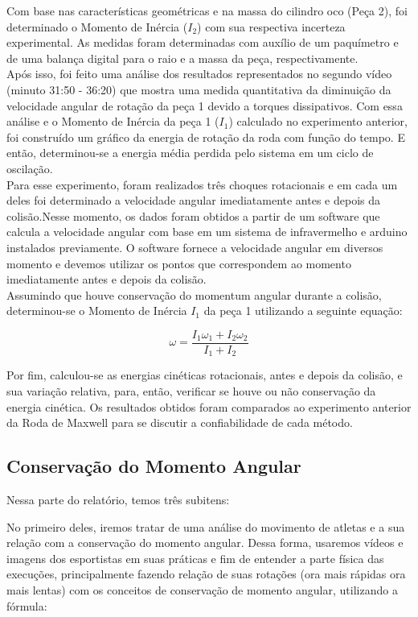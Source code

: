 Com base nas características geométricas e na massa do cilindro oco (Peça 2), foi determinado o Momento de Inércia ($I_2$) com sua respectiva incerteza experimental. As medidas foram determinadas com auxílio de um paquímetro e de uma balança digital para o raio e a massa da peça, respectivamente.\\

Após isso, foi feito uma análise dos resultados representados no segundo vídeo (minuto 31:50 - 36:20) que mostra uma medida quantitativa da diminuição da velocidade angular de rotação da peça 1 devido a torques dissipativos. Com essa análise e o Momento de Inércia da peça 1 ($I_1$) calculado no experimento anterior, foi construído um gráfico da energia de rotação da roda com função do tempo. E então, determinou-se a energia média perdida pelo sistema em um ciclo de oscilação.\\

Para esse experimento, foram realizados três choques rotacionais e em cada um deles foi determinado a velocidade angular imediatamente antes e depois da colisão.Nesse momento, os dados foram obtidos a partir de um software que calcula a velocidade angular com base em um sistema de infravermelho e arduino instalados previamente. O software fornece a velocidade angular em diversos momento e devemos utilizar os pontos que correspondem ao momento imediatamente antes e depois da colisão.\\

Assumindo que houve conservação do momentum angular durante a colisão, determinou-se o Momento de Inércia $I_1$ da peça 1 utilizando a seguinte equação:

\[ \omega = \frac{I_1 \omega_1+I_2 \omega_2}{I_1+I_2} \]

Por fim, calculou-se as energias cinéticas rotacionais, antes e depois da colisão, e sua variação relativa, para, então, verificar se houve ou não conservação da energia cinética. Os resultados obtidos foram comparados ao experimento anterior da Roda de Maxwell para se discutir a confiabilidade de cada método.



\subsection{Conservação do Momento Angular}
Nessa parte do relatório, temos três subitens:

No primeiro deles, iremos tratar de uma análise do movimento de atletas e a sua relação com a conservação do momento angular. Dessa forma, usaremos vídeos e imagens dos esportistas em suas práticas e fim de entender a parte física das execuções, principalmente fazendo relação de suas rotações (ora mais rápidas ora mais lentas) com os conceitos de conservação de momento angular, utilizando a fórmula:

